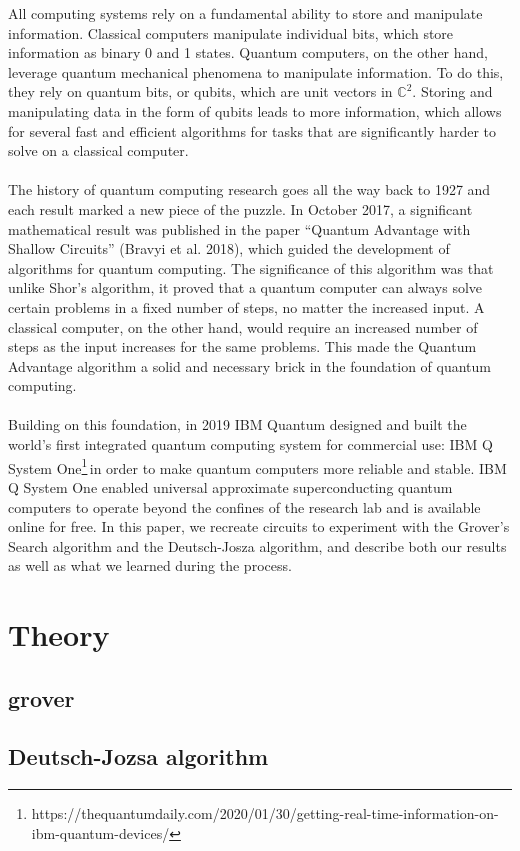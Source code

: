 \documentclass{article}
\newcommand{\ibm}{\footnote{https://thequantumdaily.com/2020/01/30/getting-real-time-information-on-ibm-quantum-devices/}}
\begin{document}
    \noindent
    All computing systems rely on a fundamental ability to store and manipulate information. Classical computers manipulate individual bits, which store information as binary 0 and 1 states. Quantum computers, on the other hand, leverage quantum mechanical phenomena to manipulate information. To do this, they rely on quantum bits, or qubits, which are unit vectors in $\mathbb{C}^2$. Storing and manipulating data in the form of qubits leads to more information, which allows for several fast and efficient algorithms for tasks that are significantly harder to solve on a classical computer.
    \\
    \smallskip
    \\
    The history of quantum computing research goes all the way back to 1927 and each result marked a new piece of the puzzle. In October 2017, a significant mathematical result was published in the paper “Quantum Advantage with Shallow Circuits” (Bravyi et al. 2018), which guided the development of algorithms for quantum computing. The significance of this algorithm was that unlike Shor’s algorithm, it proved that a quantum computer can always solve certain problems in a fixed number of steps, no matter the increased input. A classical computer, on the other hand,  would require an increased number of steps as the input increases for the same problems. This made the Quantum Advantage algorithm a solid and necessary brick in the foundation of quantum computing.
    \\
    \smallskip
    \\
    Building on this foundation, in 2019 IBM Quantum designed and built the world’s first integrated quantum computing system for commercial use: IBM Q System One\ibm\,in order to make quantum computers more reliable and stable. IBM Q System One enabled universal approximate superconducting quantum computers to operate beyond the confines of the research lab and is available online for free. In this paper, we recreate circuits to experiment with the Grover’s Search algorithm and the Deutsch-Josza algorithm, and describe both our results as well as what we learned during the process.


\section{Theory}
    \subsection{grover}
    \subsection{Deutsch-Jozsa algorithm}
        
\end{document}
